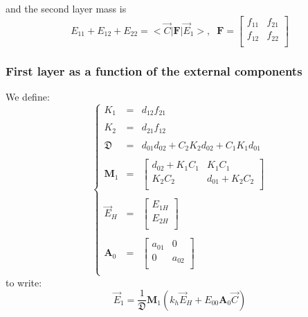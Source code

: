 \documentclass[aps,onecolumn,12pt]{revtex4}
\newcommand{\mymat}[1]{{\bm{#1}}}
\begin{document}
and the second layer mass is
\begin{equation}
E_{11} + E_{12} + E_{22} = <{\vec{C}} \vert \mymat{F} \vert \vec{E}_1 >, \;\;
 \mymat{F} 
 = \begin{bmatrix}
	f_{11} & f_{21}\\
	f_{12} & f_{22}\\
\end{bmatrix}
\end{equation}

\subsubsection{First layer as a function of the external components}
We define:
\begin{equation}
\left\lbrace
\begin{array}{rcl}
K_1 & = & d_{12} f_{21} \\
\\
K_2 & = &  d_{21} f_{12}\\
\\
\mathfrak{D} & = & d_{01} d_{02}+ C_2 K_2 d_{02}+C_1K_1 d_{01}\\
\\
\mymat{M}_1  & = &  \begin{bmatrix}
   d_{02} + K_1 C_1 & K_1 C_1 \\
   K_2C_2 & d_{01} + K_2 C_2 \\
 \end{bmatrix}
\\
\\
\vec{E}_H & = & \begin{bmatrix}
 E_{1H}\\
 E_{2H}\\
 \end{bmatrix}\\
 \\
 \mymat{A}_0 & = & \begin{bmatrix}
 a_{01} & 0 \\
 0 & a_{02}\\
 \end{bmatrix}\\
\end{array}
\right.
\end{equation}
to write:
\begin{equation}
\boxed{
	\vec{E}_1 =  \dfrac{1}{ \mathfrak{D} }
	\mymat{M}_1	
 \left(
k_h 
 \vec{E}_H
 +E_{00} 
 \mymat{A}_0
 \vec{C}
\right)
}
\end{equation}
\end{document}
